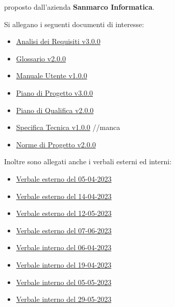 \documentclass[10pt]{article}
\begin{document}
proposto dall’azienda \textbf{Sanmarco Informatica}.


Si allegano i seguenti documenti di interesse:
\begin{itemize}
  \item \href{https://github.com/7clickers/PB/blob/main/documentazione_esterna/analisi_dei_requisiti_v3.0.0.pdf}{Analisi dei Requisiti v3.0.0}
  \item \href{https://github.com/7clickers/PB/blob/main/documentazione_esterna/glossario_v2.0.0.pdf}{Glossario v2.0.0}
  \item \href{https://github.com/7clickers/PB/blob/main/documentazione_esterna/manuale_utente_1.0.0.pdf}{Manuale Utente v1.0.0}
  \item \href{https://github.com/7clickers/PB/blob/main/documentazione_esterna/piano_di_progetto_v3.0.0.pdf}{Piano di Progetto v3.0.0}
  \item \href{https://github.com/7clickers/PB/blob/main/documentazione_esterna/piano_di_qualifica_v2.0.0.pdf}{Piano di Qualifica v2.0.0}
  \item \href{https://github.com/7clickers/Documentazione-7clickers/blob/main/RTB/documentazione_esterna/piano_di_qualifica_v1.0.0.pdf}{Specifica Tecnica v1.0.0} //manca
  \item \href{https://github.com/7clickers/PB/blob/main/documentazione_interna/norme_di_progetto_v2.0.0.pdf}{Norme di Progetto v2.0.0}
\end{itemize}

Inoltre sono allegati anche i verbali esterni ed interni:

\begin{itemize}
  \item \href{https://github.com/7clickers/PB/blob/main/documentazione_esterna/verbali/VE_2023-04-05.pdf}{Verbale esterno del 05-04-2023}
  \item \href{https://github.com/7clickers/PB/blob/main/documentazione_esterna/verbali/VE_2023-04-14.pdf}{Verbale esterno del 14-04-2023}
  \item \href{https://github.com/7clickers/PB/blob/main/documentazione_esterna/verbali/VE_2023-05-12.pdf}{Verbale esterno del 12-05-2023}
  \item \href{https://github.com/7clickers/PB/blob/main/documentazione_esterna/verbali/VE_2023-06-07.pdf}{Verbale esterno del 07-06-2023}
  \item \href{https://github.com/7clickers/PB/blob/main/documentazione_interna/verbali/VI_2023-04-06.pdf}{Verbale interno del 06-04-2023}
  \item \href{https://github.com/7clickers/PB/blob/main/documentazione_interna/verbali/VI_2023-04-19.pdf}{Verbale interno del 19-04-2023}
  \item \href{https://github.com/7clickers/PB/blob/main/documentazione_interna/verbali/VI_2023-05-05.pdf}{Verbale interno del 05-05-2023}
  \item \href{https://github.com/7clickers/PB/blob/main/documentazione_interna/verbali/VI_2023-05-29.pdf}{Verbale interno del 29-05-2023}
\end{itemize}
\end{document}
